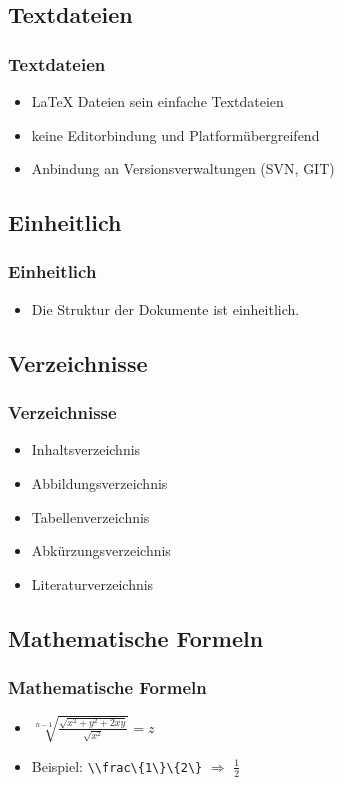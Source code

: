 \documentclass[xcolor=dvipsnames]{beamer}
\begin{document}
\subsection{Textdateien}
\begin{frame}
  \frametitle{Textdateien}
	\begin{block}{}	
		\begin{itemize}
  			\item \LaTeX{} Dateien sein einfache Textdateien
  			\item keine Editorbindung und Platformübergreifend
	  		\item Anbindung an Versionsverwaltungen (SVN, GIT)
		\end{itemize}
	\end{block}	
\end{frame}

\subsection{Einheitlich}
\begin{frame}
  \frametitle{Einheitlich}
	\begin{block}{}	
		\begin{itemize}
  			\item Die Struktur der Dokumente ist einheitlich.
		\end{itemize}
	\end{block}	
\end{frame}

\subsection{Verzeichnisse}
\begin{frame}
  \frametitle{Verzeichnisse}
	\begin{block}{}	
		\begin{itemize}
  			\item Inhaltsverzeichnis
  			\item Abbildungsverzeichnis
  			\item Tabellenverzeichnis
	  		\item Abkürzungsverzeichnis
  			\item Literaturverzeichnis
		\end{itemize}
	\end{block}			
\end{frame}

\subsection{Mathematische Formeln}
\begin{frame}
  \frametitle{Mathematische Formeln}
	\begin{block}{}	
		\begin{itemize}
  			\item $\sqrt[n-1] {\frac{\sqrt{x^2+y^2+2xy}}{\sqrt{x^2}}} = z$ \pause
	  		\item Beispiel: \lstinline!\\frac\{1\}\{2\}! $\Rightarrow$ $\frac{1}{2}$ 
		\end{itemize}
	\end{block}			
\end{frame}
\end{document}
